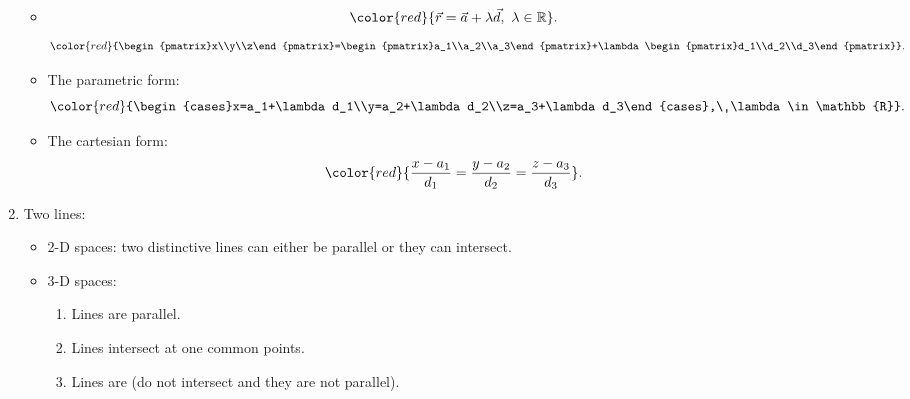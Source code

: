 \documentclass[12pt, a4paper]{article}
\def\d{{\mathrm{d}}}
\begin{document}
\begin{enumerate}
\begin{itemize}
    \item $${\color{red}{\vec{r}=\vec{a}+\lambda\vec{d},\ \lambda\in\mathbb{R}}}.$$
    $${\color{red}{\begin{pmatrix}x\\y\\z\end{pmatrix}=\begin{pmatrix}a_1\\a_2\\a_3\end{pmatrix}+\lambda\begin{pmatrix}d_1\\d_2\\d_3\end{pmatrix}}}.$$
    \item The parametric form: 
    $${\color{red}{\begin{cases}x=a_1+\lambda d_1\\y=a_2+\lambda d_2\\z=a_3+\lambda d_3\end{cases},\ \lambda\in\mathbb{R}}}.$$
    \item The cartesian form: 
    $${\color{red}{\frac{x-a_1}{d_1}=\frac{y-a_2}{d_2}=\frac{z-a_3}{d_3}}}.$$
  \end{itemize}
  \item Two lines: 
  \begin{itemize}
    \item 2-D spaces: two distinctive lines can either be parallel or they can intersect. 
    \item 3-D spaces: 
    \begin{enumerate}
      \item Lines are parallel.
      \item Lines intersect at one common points.
      \item Lines are \textbf{\color{red}{skewed}} (do not intersect and they are not parallel).
    \end{enumerate}
  \end{itemize}
\end{enumerate}
\end{document}
